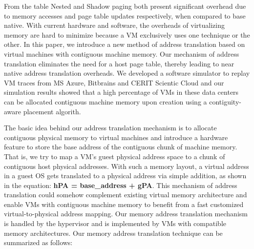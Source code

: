 \documentclass[sigconf]{sigplanconf}
\begin{document}
   
   \begin{table}[!h]
   	\centering
   	\caption{Trade-offs provided by shadow and nested paging as compared to base native}
   	\label{tab:tradeoffs}
   \end{table}   
   From the table Nested and Shadow paging both present significant overhead due to memory accesses and page table updates respectively, when compared to base native. With current hardware and software, the overheads of virtualizing memory are hard to minimize because a VM exclusively uses one technique or the other.
   In this paper, we introduce a new method of address translation based on virtual machines with contiguous machine memory. Our mechanism of address translation eliminates the need for a host page table, thereby leading to near native address translation overheads. We developed a software simulator to replay VM traces from MS Azure, Bitbrains and CERIT Scientic Cloud and our simulation results showed that a high percentage of VMs in these data centers can be allocated contiguous machine memory upon creation using a contiguity-aware placement algorith. 
   
    The basic idea behind our address translation mechanism is to allocate contiguous physical memory to virtual machines and introduce a hardware feature to store the base address of the contiguous chunk of machine memory. That is, we try to map a VM's guest physical address space to a chunk of contiguous host physical addresses. With such a memory layout, a virtual address in a guest OS gets translated to a physical address via simple addition, as shown in the equation:\textbf{ hPA = base\_address + gPA}. This mechanism of address translation could somehow complement existing virtual memory architecture and enable VMs with contiguous machine memory to benefit from a fast customized virtual-to-physical address mapping. Our memory address translation mechanism is handled by the hypervisor and is implemented by VMs with compatible memory architectures.    
   Our memory address translation technique can be summarized as follows:
\end{document}
